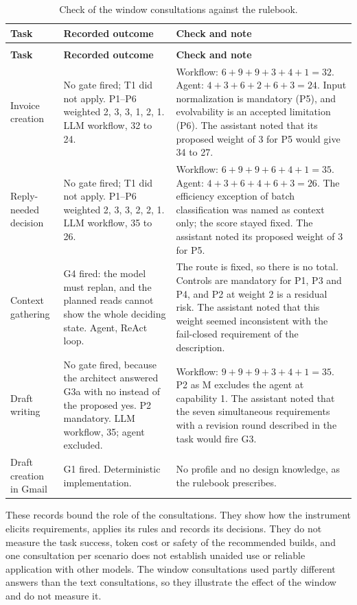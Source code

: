 \begingroup
\renewcommand{\baselinestretch}{1}\small
\setlength{\tabcolsep}{3pt}\renewcommand{\arraystretch}{1.08}
\begin{longtable}{>{\raggedright\arraybackslash}p{} >{\raggedright\arraybackslash}p{} >{\raggedright\arraybackslash}p{}}
\caption[Check of the window consultations against the rulebook]{Check of the window consultations against the rulebook.}\label{tab:demo-window-audit}\\
\toprule
\textbf{Task} & \textbf{Recorded outcome} & \textbf{Check and note} \\
\midrule
\endfirsthead
\multicolumn{3}{l}{\tablename~\thetable{} (continued)}\\
\toprule
\textbf{Task} & \textbf{Recorded outcome} & \textbf{Check and note}\\
\midrule
\endhead
\bottomrule
\endlastfoot
Invoice creation & No gate fired; T1 did not apply. P1--P6 weighted 2, 3, 3, 1, 2, 1. LLM workflow, 32 to 24. & Workflow: $6+9+9+3+4+1=32$. Agent: $4+3+6+2+6+3=24$. Input normalization is mandatory (P5), and evolvability is an accepted limitation (P6). The assistant noted that its proposed weight of 3 for P5 would give 34 to 27. \\
\addlinespace
Reply-needed decision & No gate fired; T1 did not apply. P1--P6 weighted 2, 3, 3, 2, 2, 1. LLM workflow, 35 to 26. & Workflow: $6+9+9+6+4+1=35$. Agent: $4+3+6+4+6+3=26$. The efficiency exception of batch classification was named as context only; the score stayed fixed. The assistant noted its proposed weight of 3 for P5. \\
\addlinespace
Context gathering & G4 fired: the model must replan, and the planned reads cannot show the whole deciding state. Agent, ReAct loop. & The route is fixed, so there is no total. Controls are mandatory for P1, P3 and P4, and P2 at weight 2 is a residual risk. The assistant noted that this weight seemed inconsistent with the fail-closed requirement of the description. \\
\addlinespace
Draft writing & No gate fired, because the architect answered G3a with no instead of the proposed yes. P2 mandatory. LLM workflow, 35; agent excluded. & Workflow: $9+9+9+3+4+1=35$. P2 as M excludes the agent at capability 1. The assistant noted that the seven simultaneous requirements with a revision round described in the task would fire G3. \\
\addlinespace
Draft creation in Gmail & G1 fired. Deterministic implementation. & No profile and no design knowledge, as the rulebook prescribes. \\
\end{longtable}
\endgroup

These records bound the role of the consultations. They show how the instrument elicits requirements, applies its rules and records its decisions. They do not measure the task success, token cost or safety of the recommended builds, and one consultation per scenario does not establish unaided use or reliable application with other models. The window consultations used partly different answers than the text consultations, so they illustrate the effect of the window and do not measure it.
